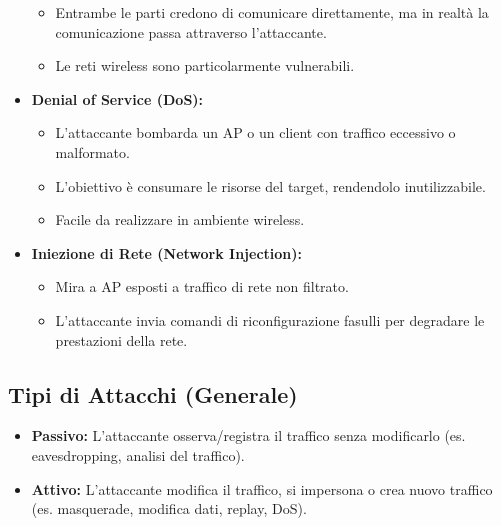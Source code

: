\begin{itemize}
\begin{itemize}
        \item Entrambe le parti credono di comunicare direttamente, ma in realtà la comunicazione passa attraverso l'attaccante.
        \item Le reti wireless sono particolarmente vulnerabili.
    \end{itemize}
    \item \textbf{Denial of Service (DoS):}
    \begin{itemize}
        \item L'attaccante bombarda un AP o un client con traffico eccessivo o malformato.
        \item L'obiettivo è consumare le risorse del target, rendendolo inutilizzabile.
        \item Facile da realizzare in ambiente wireless.
    \end{itemize}
    \item \textbf{Iniezione di Rete (Network Injection):}
    \begin{itemize}
        \item Mira a AP esposti a traffico di rete non filtrato.
        \item L'attaccante invia comandi di riconfigurazione fasulli per degradare le prestazioni della rete.
    \end{itemize}
\end{itemize}

\subsection{Tipi di Attacchi (Generale)}
\begin{itemize}
    \item \textbf{Passivo:} L'attaccante osserva/registra il traffico senza modificarlo (es. eavesdropping, analisi del traffico).
    \item \textbf{Attivo:} L'attaccante modifica il traffico, si impersona o crea nuovo traffico (es. masquerade, modifica dati, replay, DoS).
\end{itemize}

